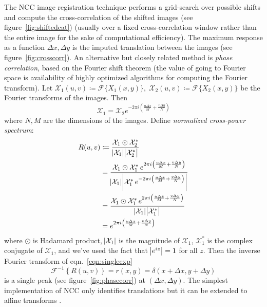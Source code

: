 
%
The NCC image registration technique performs a grid-search over possible shifts and compute the cross-correlation of the shifted images (see figure~\ref{fig:shiftedcat}) (usually over a fixed cross-correlation window rather than the entire image for the sake of computational efficiency).
%
The maximum response as a function \(\Delta x, \Delta y\) is the imputed translation between the images (see figure~\ref{fig:crosscorr}).
%
An alternative but closely related method is \textit{phase correlation}, based on the Fourier shift theorem  (the value of going to Fourier space is availability of highly optimized algorithms for computing the Fourier transform).
%
Let \(\mathcal{X}_1(u,v) \coloneqq \mathcal{F}\{X_1(x,y)\}, \; \mathcal{X}_2(u,v) \coloneqq \mathcal{F}\{X_2(x,y)\}\) be the Fourier transforms of the images.
%
Then
\[
	\mathcal{X}_1 = \mathcal{X}_2  e^{-2 \pi i \left(\frac{u \Delta x}{M} + \frac{v \Delta y}{N}\right)}
\]
where \(N,M\) are the dimensions of the images.
%
Define \textit{normalized cross-power spectrum}:
\begin{align}
	R(u,v) & \coloneqq \frac{\mathcal{X}_1\odot \mathcal{X}_2^{*}}{\abs{\mathcal{X}_1 }\abs{\mathcal{X}_2^{*} }}                                                                                                                    \\
	       & = \frac{\mathcal{X}_1\odot \mathcal{X}_1^{*} \, e^{2 \pi i \left(\frac{u \Delta x}{M} + \frac{v \Delta y}{N}\right)}}{\abs{\mathcal{X}_1 }\abs{\mathcal{X}_1^{*} \, e^{-2 \pi i \left(\frac{u \Delta x}{M} + \frac{v \Delta y}{N}\right)} }} \\
	       & = \frac{\mathcal{X}_1\odot \mathcal{X}_1^{*} \, e^{2 \pi i \left(\frac{u \Delta x}{M} + \frac{v \Delta y}{N}\right)}}{\abs{\mathcal{X}_1 }\abs{\mathcal{X}_1^{*} }}                                                               \\
	       & = e^{2 \pi i \left(\frac{u \Delta x}{M} + \frac{v \Delta y}{N}\right)} \label{eqn:singleexp}
\end{align}
where \(\odot\) is Hadamard product, \(\abs{\mathcal{X}_1}\) is the magnitude of \(\mathcal{X}_1\), \(\mathcal{X}_1^*\) is the complex conjugate of \(\mathcal{X}_1\), and we've used the fact that \(\abs{e^{iz}}=1\) for all \(z\).
%
Then the inverse Fourier transform of eqn.~\eqref{eqn:singleexp}
\[
	\mathcal{F}^{-1}\left\{ R(u,v) \right\} = r(x,y) = \delta(x + \Delta x, y + \Delta y)
\]
is a single peak (see figure~\ref{fig:phasecorr}) at \((\Delta x, \Delta y)\).
%
The simplest implementation of NCC only identifies translations but it can be extended to affine transforms \cite{berthilsson1998}.

